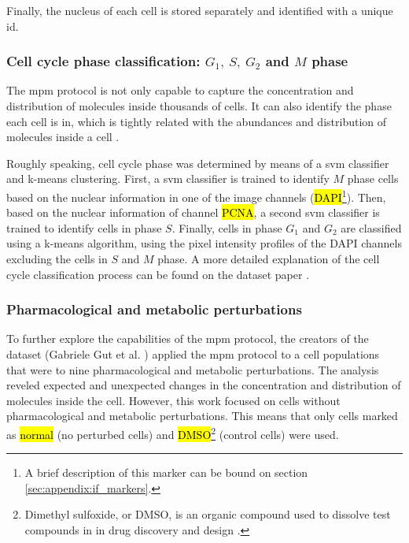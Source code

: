 Finally, the nucleus of each cell is stored separately and identified with a unique id.

\subsubsection{Cell cycle phase classification: $G_1,\ S,\ G_2$ and $M$ phase}

The \gls{mpm} protocol is not only capable to capture the concentration and distribution of molecules inside thousands of cells. It can also identify the phase each cell is in, which is tightly related with the abundances and distribution of molecules inside a cell \cite{Guteaar7042}.

Roughly speaking, cell cycle phase was determined by means of a \gls{svm} classifier and k-means clustering. First, a \gls{svm} classifier is trained to identify $M$ phase cells based on the nuclear information in one of the image channels (\hl{DAPI}\footnote{A brief description of this marker can be bound on section \ref{sec:appendix:if_markers}.}). Then, based on the nuclear information of channel \hl{PCNA}, a second \gls{svm} classifier is trained to identify cells in phase $S$. Finally, cells in phase $G_1$ and $G_2$ are classified using a k-means algorithm, using the pixel intensity profiles of the DAPI channels excluding the cells in $S$ and $M$ phase. A more detailed explanation of the cell cycle classification process can be found on the dataset paper \cite{Guteaar7042}.

\subsubsection{Pharmacological and metabolic perturbations}

To further explore the capabilities of the \gls{mpm} protocol, the creators of the dataset (Gabriele Gut et al. \cite{Guteaar7042}) applied the \gls{mpm} protocol to a cell populations that were to nine pharmacological and metabolic perturbations. The analysis reveled expected and unexpected changes in the concentration and distribution of molecules inside the cell. However, this work focused on cells without pharmacological and metabolic perturbations. This means that only cells marked as \hl{normal} (no perturbed cells) and \hl{DMSO}\footnote{Dimethyl sulfoxide, or DMSO, is an organic compound used to dissolve test compounds in in drug discovery and design \cite{cushnie2020bioprospecting}.} (control cells) were used.

